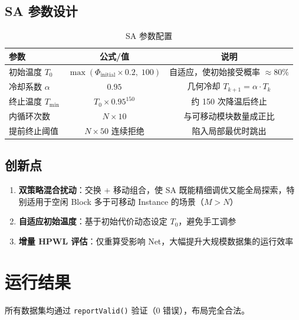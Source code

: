 \documentclass[12pt,a4paper]{ctexart}
\begin{document}
\subsection{SA 参数设计}

\begin{table}[H]
\centering
\caption{SA 参数配置}
\begin{tabular}{@{}lcc@{}}
\toprule
\textbf{参数} & \textbf{公式/值} & \textbf{说明} \\
\midrule
初始温度 $T_0$ & $\max(\Phi_{\text{initial}} \times 0.2,\; 100)$ & 自适应，使初始接受概率 $\approx 80\%$ \\
冷却系数 $\alpha$ & $0.95$ & 几何冷却 $T_{k+1} = \alpha \cdot T_k$ \\
终止温度 $T_{\min}$ & $T_0 \times 0.95^{150}$ & 约 150 次降温后终止 \\
内循环次数 & $N \times 10$ & 与可移动模块数量成正比 \\
提前终止阈值 & $N \times 50$ 连续拒绝 & 陷入局部最优时跳出 \\
\bottomrule
\end{tabular}
\end{table}

\subsection{创新点}

\begin{enumerate}[label=(\arabic*), leftmargin=*]
    \item \textbf{双策略混合扰动}：交换 + 移动组合，使 SA 既能精细调优又能全局探索，特别适用于空闲 Block 多于可移动 Instance 的场景（$M > N$）
    \item \textbf{自适应初始温度}：基于初始代价动态设定 $T_0$，避免手工调参
    \item \textbf{增量 HPWL 评估}：仅重算受影响 Net，大幅提升大规模数据集的运行效率
\end{enumerate}

\section{运行结果}

所有数据集均通过 \texttt{reportValid()} 验证（0 错误），布局完全合法。
\end{document}
